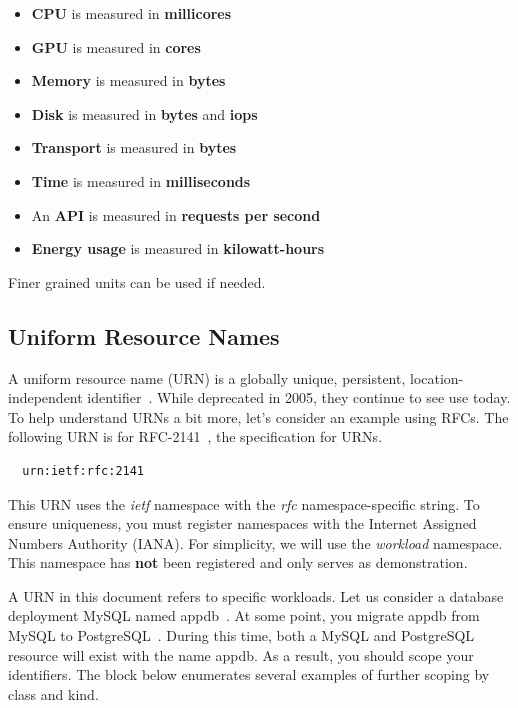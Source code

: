 \documentclass[10pt, a4paper, twocolumn]{article}
\begin{document}
    \begin{itemize}
      \item \textbf{CPU} is measured in \textbf{millicores}
      \item \textbf{GPU} is measured in \textbf{cores}
      \item \textbf{Memory} is measured in \textbf{bytes}
      \item \textbf{Disk} is measured in \textbf{bytes} and \textbf{iops}
      \item \textbf{Transport} is measured in \textbf{bytes}
      \item \textbf{Time} is measured in \textbf{milliseconds}
      \item An \textbf{API} is measured in \textbf{requests per second}
      \item \textbf{Energy usage} is measured in \textbf{kilowatt-hours}
    \end{itemize}

    Finer grained units can be used if needed.

  \subsection*{Uniform Resource Names}
    A uniform resource name (URN) is a globally unique, persistent, location-independent identifier~\cite{rfc8141}.
    While deprecated in 2005, they continue to see use today.
    To help understand URNs a bit more, let's consider an example using RFCs.
    The following URN is for RFC-2141~\cite{rfc2141}, the specification for URNs.

\begin{verbatim}
  urn:ietf:rfc:2141
\end{verbatim}

    This URN uses the \textit{ietf} namespace with the \textit{rfc} namespace-specific string.
    To ensure uniqueness, you must register namespaces with the Internet Assigned Numbers Authority (IANA).
    For simplicity, we will use the \textit{workload} namespace.
    This namespace has \textbf{not} been registered and only serves as demonstration.

    A URN in this document refers to specific workloads.
    Let us consider a database deployment MySQL named appdb~\cite{mysql}.
    At some point, you migrate appdb from MySQL to PostgreSQL~\cite{postgres}.
    During this time, both a MySQL and PostgreSQL resource will exist with the name appdb.
    As a result, you should scope your identifiers.
    The block below enumerates several examples of further scoping by class and kind.
\end{document}
